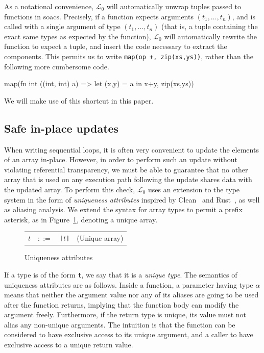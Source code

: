 \documentclass{sigplanconf}  %
\newcommand{\LO}{$\mathcal{L}_0$}
\begin{document}
As a notational convenience, \LO{} will automatically unwrap tuples
passed to functions in {\sc soac}s.  Precisely, if a function expects
arguments $(t_{1},\ldots,t_{n})$, and is called with a single argument
of type $(t_{1},\ldots,t_{n})$ (that is, a tuple containing the exact
same types as expected by the function), \LO{} will automatically
rewrite the function to expect a tuple, and insert the code necessary
to extract the components.  This permits us to write {\tt map(op +,
  zip(xs,ys))}, rather than the following more cumbersome code.
\begin{colorcode}
  map(fn int ((int, int) a) => let (x,y) = a in x+y,
      zip(xs,ys))
\end{colorcode}
We will make use of this shortcut in this paper.

\subsection{Safe in-place updates}
\label{sec:in-place}

When writing sequential loops, it is often very convenient to update
the elements of an array in-place.  However, in order to perform such
an update without violating referential transparency, we must be able
to guarantee that no other array that is used on any execution
path following the update shares data with the updated array.  To
perform this check, \LO{} uses an extension to the type system in the
form of {\em uniqueness attributes} inspired by
Clean~\cite{clean-uniqueness-types} and Rust~\cite{rust}, as well as
aliasing analysis.  We extend the syntax for array types to permit a
prefix asterisk, as in Figure~\ref{fig:uniqueness-types},
denoting a unique array.

\begin{figure}[bt]
\begin{tabular}{lrll}
$t$ & $::=$ & {\tt *[$t$]} & (Unique array) \\
\end{tabular}
\caption{Uniqueness attributes}
\label{fig:uniqueness-types}
\end{figure}

If a type is of the form {\tt *t}, we say that it is a {\em unique
  type}.  The semantics of uniqueness attributes are as follows.
Inside a function, a parameter having type {\tt *$\alpha$} means that
neither the argument value nor any of its aliases are going to be used
after the function returns, implying that the function body can modify
the argument freely.  Furthermore, if the return type is unique, its
value must not alias any non-unique arguments.  The intuition is that
the function can be considered to have exclusive access to its unique
argument, and a caller to have exclusive access to a unique return
value.
\end{document}
